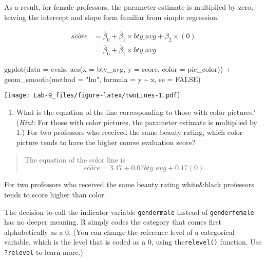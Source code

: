 \documentclass[
]{article}
\newenvironment{Shaded}{\begin{snugshade}}{\end{snugshade}}
\newcommand{\AttributeTok}[1]{\textcolor[rgb]{0.77,0.63,0.00}{#1}}
\newcommand{\ConstantTok}[1]{\textcolor[rgb]{0.00,0.00,0.00}{#1}}
\newcommand{\FunctionTok}[1]{\textcolor[rgb]{0.00,0.00,0.00}{#1}}
\newcommand{\NormalTok}[1]{#1}
\newcommand{\SpecialCharTok}[1]{\textcolor[rgb]{0.00,0.00,0.00}{#1}}
\newcommand{\StringTok}[1]{\textcolor[rgb]{0.31,0.60,0.02}{#1}}
\providecommand{\tightlist}{%
  \setlength{\itemsep}{0pt}\setlength{\parskip}{0pt}}
\begin{document}
As a result, for female professors, the parameter estimate is multiplied
by zero, leaving the intercept and slope form familiar from simple
regression.

\[
  \begin{aligned}
\widehat{score} &= \hat{\beta}_0 + \hat{\beta}_1 \times bty\_avg + \hat{\beta}_2 \times (0) \\
&= \hat{\beta}_0 + \hat{\beta}_1 \times bty\_avg\end{aligned}
\]

\begin{Shaded}
\begin{Highlighting}[]
\FunctionTok{ggplot}\NormalTok{(}\AttributeTok{data =}\NormalTok{ evals, }\FunctionTok{aes}\NormalTok{(}\AttributeTok{x =}\NormalTok{ bty\_avg, }\AttributeTok{y =}\NormalTok{ score, }\AttributeTok{color =}\NormalTok{ pic\_color)) }\SpecialCharTok{+} \FunctionTok{geom\_smooth}\NormalTok{(}\AttributeTok{method =} \StringTok{"lm"}\NormalTok{,}
    \AttributeTok{formula =}\NormalTok{ y }\SpecialCharTok{\textasciitilde{}}\NormalTok{ x, }\AttributeTok{se =} \ConstantTok{FALSE}\NormalTok{)}
\end{Highlighting}
\end{Shaded}

\texttt{[image: Lab-9\_files/figure-latex/twoLines-1.pdf]}

\begin{enumerate}
\def\labelenumi{\arabic{enumi}.}
\setcounter{enumi}{8}
\tightlist
\item
  What is the equation of the line corresponding to those with color
  pictures? (\emph{Hint:} For those with color pictures, the parameter
  estimate is multiplied by 1.) For two professors who received the same
  beauty rating, which color picture tends to have the higher course
  evaluation score?
\end{enumerate}

\begin{quote}
The equation of the color line is \[
\widehat{score} = 3.47 + 0.07 bty\_avg + 0.17(0)
\]
\end{quote}

For two professors who received the same beauty rating white\&black
professors tends to score higher than color.

The decision to call the indicator variable \texttt{gendermale} instead
of \texttt{genderfemale} has no deeper meaning. R simply codes the
category that comes first alphabetically as a \(0\). (You can change the
reference level of a categorical variable, which is the level that is
coded as a 0, using the\texttt{relevel()} function. Use
\texttt{?relevel} to learn more.)
\end{document}
